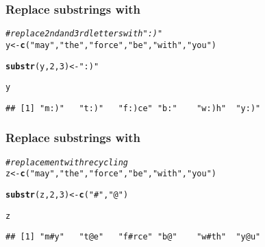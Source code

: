 \documentclass[12pt]{beamer}\usepackage[]{graphicx}\usepackage[]{color}
\makeatletter
\newcommand{\hlnum}[1]{\textcolor[rgb]{0.686,0.059,0.569}{#1}}%
\newcommand{\hlstr}[1]{\textcolor[rgb]{0.192,0.494,0.8}{#1}}%
\newcommand{\hlcom}[1]{\textcolor[rgb]{0.678,0.584,0.686}{\textit{#1}}}%
\newcommand{\hlstd}[1]{\textcolor[rgb]{0.345,0.345,0.345}{#1}}%
\newcommand{\hlkwb}[1]{\textcolor[rgb]{0.69,0.353,0.396}{#1}}%
\newcommand{\hlkwd}[1]{\textcolor[rgb]{0.737,0.353,0.396}{\textbf{#1}}}%
\newenvironment{kframe}{%
 \def\at@end@of@kframe{}%
 \ifinner\ifhmode%
  \def\at@end@of@kframe{\end{minipage}}%
  \begin{minipage}{\columnwidth}%
 \fi\fi%
 \def\FrameCommand##1{\hskip\@totalleftmargin \hskip-\fboxsep
 \colorbox{shadecolor}{##1}\hskip-\fboxsep
     \hskip-\linewidth \hskip-\@totalleftmargin \hskip\columnwidth}%
 \MakeFramed {\advance\hsize-\width
   \@totalleftmargin\z@ \linewidth\hsize
   \@setminipage}}%
 {\par\unskip\endMakeFramed%
 \at@end@of@kframe}
\newenvironment{knitrout}{}{} %
\makeatother
\begin{document}

\begin{frame}[fragile]
\frametitle{Replace substrings with }

\begin{knitrout}\footnotesize
{}\color{fgcolor}\begin{kframe}
\begin{alltt}
\hlcom{# replace 2nd and 3rd letters with ":)"}
\hlstd{y} \hlkwb{<-} \hlkwd{c}\hlstd{(}\hlstr{"may"}\hlstd{,} \hlstr{"the"}\hlstd{,} \hlstr{"force"}\hlstd{,} \hlstr{"be"}\hlstd{,} \hlstr{"with"}\hlstd{,} \hlstr{"you"}\hlstd{)}

\hlkwd{substr}\hlstd{(y,} \hlnum{2}\hlstd{,} \hlnum{3}\hlstd{)} \hlkwb{<-} \hlstr{":)"}

\hlstd{y}
\end{alltt}
\begin{verbatim}
## [1] "m:)"   "t:)"   "f:)ce" "b:"    "w:)h"  "y:)"
\end{verbatim}
\end{kframe}
\end{knitrout}

\end{frame}


\begin{frame}[fragile]
\frametitle{Replace substrings with }

\begin{knitrout}\footnotesize
{}\color{fgcolor}\begin{kframe}
\begin{alltt}
\hlcom{# replacement with recycling}
\hlstd{z} \hlkwb{<-} \hlkwd{c}\hlstd{(}\hlstr{"may"}\hlstd{,} \hlstr{"the"}\hlstd{,} \hlstr{"force"}\hlstd{,} \hlstr{"be"}\hlstd{,} \hlstr{"with"}\hlstd{,} \hlstr{"you"}\hlstd{)}

\hlkwd{substr}\hlstd{(z,} \hlnum{2}\hlstd{,} \hlnum{3}\hlstd{)} \hlkwb{<-} \hlkwd{c}\hlstd{(}\hlstr{"#"}\hlstd{,} \hlstr{"@"}\hlstd{)}

\hlstd{z}
\end{alltt}
\begin{verbatim}
## [1] "m#y"   "t@e"   "f#rce" "b@"    "w#th"  "y@u"
\end{verbatim}
\end{kframe}
\end{knitrout}

\end{frame}
\end{document}
